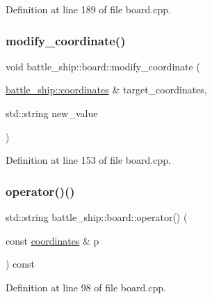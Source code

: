 Definition at line 189 of file board.\+cpp.

\mbox{\label{classbattle__ship_1_1board_a1c79f537306e8f2f84c8aa41a90430e6}} 
\subsubsection{\texorpdfstring{modify\+\_\+coordinate()}{modify\_coordinate()}}
{\footnotesize\ttfamily void battle\+\_\+ship\+::board\+::modify\+\_\+coordinate (\begin{DoxyParamCaption}\item[{\hyperlink{structbattle__ship_1_1coordinates}{battle\+\_\+ship\+::coordinates} \&}]{target\+\_\+coordinates,  }\item[{std\+::string}]{new\+\_\+value }\end{DoxyParamCaption})}



Definition at line 153 of file board.\+cpp.

\mbox{\label{classbattle__ship_1_1board_a6977bbdbc6ed5855ea538dcec5a22699}} 
\subsubsection{\texorpdfstring{operator()()}{operator()()}}
{\footnotesize\ttfamily std\+::string battle\+\_\+ship\+::board\+::operator() (\begin{DoxyParamCaption}\item[{const \hyperlink{structbattle__ship_1_1coordinates}{coordinates} \&}]{p }\end{DoxyParamCaption}) const}



Definition at line 98 of file board.\+cpp.

\mbox{\label{classbattle__ship_1_1board_af23abad35f41574c7ed00052024ab253}} 
